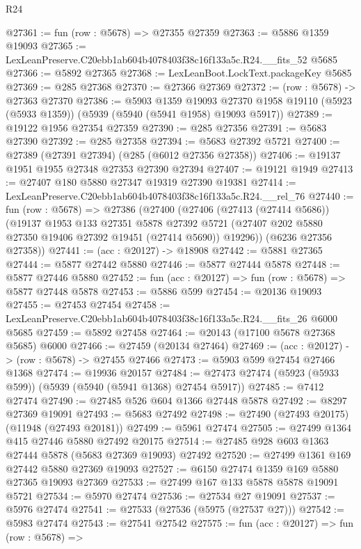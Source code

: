 \begin{lexlean}{R24}
\begin{coremodule}
@27361 := fun (row : @5678) => @27355 @27359
@27363 := @5886 @1359 @19093
@27365 := LexLeanPreserve.C20ebb1ab604b4078403f38c16f133a5c.R24.__fits_52 @5685
@27366 := @5892 @27365
@27368 := LexLeanBoot.LockText.packageKey @5685
@27369 := @285 @27368
@27370 := @27366 @27369
@27372 := (row : @5678) -> @27363 @27370
@27386 := @5903
    @1359
    @19093
    @27370
    @1958
    @19110
    (@5923 (@5933 @1359))
    (@5939 (@5940 (@5941 @1958) @19093 @5917))
@27389 := @19122 @1956 @27354 @27359
@27390 := @285 @27356
@27391 := @5683 @27390
@27392 := @285 @27358
@27394 := @5683 @27392 @5721
@27400 := @27389 (@27391 @27394) (@285 (@6012 @27356 @27358))
@27406 := @19137 @1951 @1955 @27348 @27353 @27390 @27394
@27407 := @19121 @1949
@27413 := @27407 @180 @5880 @27347 @19319 @27390 @19381
@27414 := LexLeanPreserve.C20ebb1ab604b4078403f38c16f133a5c.R24.__rel_76
@27440 := fun (row : @5678) =>
  @27386
    (@27400
      (@27406
        (@27413 (@27414 @5686))
        (@19137
          @1953
          @133
          @27351
          @5878
          @27392
          @5721
          (@27407 @202 @5880 @27350 @19406 @27392 @19451 (@27414 @5690))
          @19296))
      (@6236 @27356 @27358))
@27441 := (acc : @20127) -> @18908
@27442 := @5881 @27365
@27444 := @5877 @27442 @5880
@27446 := @5877 @27444 @5878
@27448 := @5877 @27446 @5880
@27452 := fun (acc : @20127) => fun (row : @5678) => @5877 @27448 @5878
@27453 := @5886 @599
@27454 := @20136 @19093
@27455 := @27453 @27454
@27458 := LexLeanPreserve.C20ebb1ab604b4078403f38c16f133a5c.R24.__fits_26 @6000 @5685
@27459 := @5892 @27458
@27464 := @20143 (@17100 @5678 @27368 @5685) @6000
@27466 := @27459 (@20134 @27464)
@27469 := (acc : @20127) -> (row : @5678) -> @27455 @27466
@27473 := @5903 @599 @27454 @27466 @1368
@27474 := @19936 @20157
@27484 := @27473 @27474 (@5923 (@5933 @599)) (@5939 (@5940 (@5941 @1368) @27454 @5917))
@27485 := @7412 @27474
@27490 := @27485 @526 @604 @1366 @27448 @5878
@27492 := @8297 @27369 @19091
@27493 := @5683 @27492
@27498 := @27490 (@27493 @20175) (@11948 (@27493 @20181))
@27499 := @5961 @27474
@27505 := @27499 @1364 @415 @27446 @5880 @27492 @20175
@27514 := @27485 @928 @603 @1363 @27444 @5878 (@5683 @27369 @19093) @27492
@27520 := @27499 @1361 @169 @27442 @5880 @27369 @19093
@27527 := @6150 @27474 @1359 @169 @5880 @27365 @19093 @27369
@27533 := @27499 @167 @133 @5878 @5878 @19091 @5721
@27534 := @5970 @27474
@27536 := @27534 @27 @19091
@27537 := @5976 @27474
@27541 := @27533 (@27536 (@5975 (@27537 @27)))
@27542 := @5983 @27474
@27543 := @27541 @27542
@27575 := fun (acc : @20127) =>
  fun (row : @5678) =>

\end{coremodule}
\end{lexlean}
